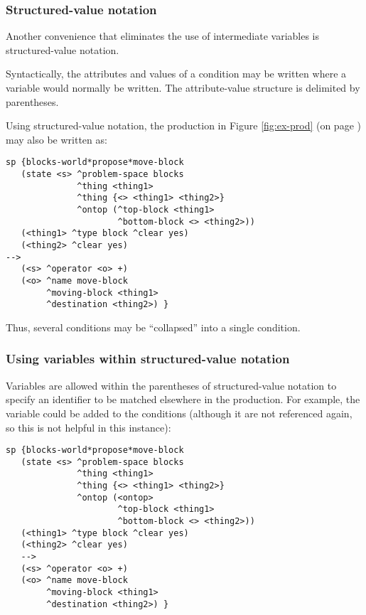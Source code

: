 \subsubsection{Structured-value notation}
\label{SYNTAX-pm-lhs-structured}

Another convenience that eliminates the use of intermediate variables is structured-value notation. 

Syntactically, the attributes and values of a condition may be written where a variable would normally be written. The attribute-value structure is delimited by parentheses.

Using structured-value notation, the production in Figure \ref{fig:ex-prod} (on page \pageref{fig:ex-prod}) may also be written as:

\begin{verbatim}
sp {blocks-world*propose*move-block
   (state <s> ^problem-space blocks
              ^thing <thing1> 
              ^thing {<> <thing1> <thing2>}
              ^ontop (^top-block <thing1>
                      ^bottom-block <> <thing2>))
   (<thing1> ^type block ^clear yes)
   (<thing2> ^clear yes)
-->
   (<s> ^operator <o> +)
   (<o> ^name move-block
        ^moving-block <thing1>
        ^destination <thing2>) }
\end{verbatim}

Thus, several conditions may be ``collapsed'' into a single condition.


\subsubsection*{Using variables within structured-value notation}

Variables are allowed within the parentheses of structured-value notation to specify an identifier to be matched elsewhere in the production. For example, the variable  could be added to the conditions (although it are not referenced again, so this is not helpful in this instance):

\begin{verbatim}
sp {blocks-world*propose*move-block
   (state <s> ^problem-space blocks
              ^thing <thing1> 
              ^thing {<> <thing1> <thing2>}
              ^ontop (<ontop> 
                      ^top-block <thing1>
                      ^bottom-block <> <thing2>))
   (<thing1> ^type block ^clear yes)
   (<thing2> ^clear yes)
   -->
   (<s> ^operator <o> +)
   (<o> ^name move-block
        ^moving-block <thing1>
        ^destination <thing2>) }
\end{verbatim}

